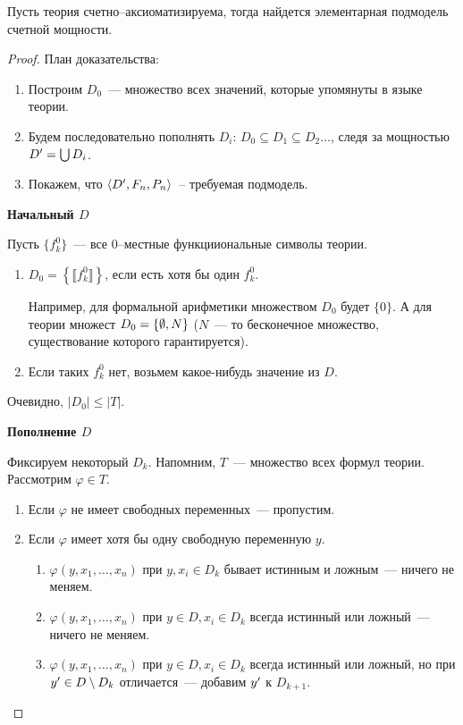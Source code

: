\begin{corollary}
    Пусть теория счетно--аксиоматизируема, тогда найдется элементарная подмодель счетной мощности.
\end{corollary}
\begin{proof}
    План доказательства:
    \begin{enumerate}
        \item Построим $D_0$~--- множество всех значений, которые упомянуты в языке теории.
        \item Будем последовательно пополнять $D_i$: $D_0 \subseteq D_1 \subseteq D_2 \dots$, следя за мощностью $D^{\prime} = \bigcup D_i$.
        \item Покажем, что $\langle D^{\prime}, F_n, P_n \rangle$~-- требуемая подмодель.
    \end{enumerate}

    \textbf{Начальный $D$}

    Пусть $\{ f_k^0 \}$~--- все 0--местные функцииональные символы теории.
    \begin{enumerate}
        \item $D_0 = \left\{ \llbracket f_k^0 \rrbracket\right\}$, если есть хотя бы один $f_k^0$.

        Например, для формальной арифметики множеством $D_0$ будет $\{0\}$. А для теории множест $D_0 = \{ \emptyset, N\}$ ($N$~--- то бесконечное множество, существование которого гарантируется).

        \item Если таких $f_k^0$ нет, возьмем какое-нибудь значение из $D$.
    \end{enumerate}
    Очевидно, $|D_0| \leqslant |T|$.

    \textbf{Пополнение $D$}

    Фиксируем некоторый $D_k$. Напомним, $T$~--- множество всех формул теории. Рассмотрим $\varphi \in T$.
    \begin{enumerate}
        \item Если $\varphi$ не имеет свободных переменных~--- пропустим.
        \item Если $\varphi$ имеет хотя бы одну свободную переменную $y$.
        \begin{enumerate}
            \item $\varphi(y, x_1, \dots, x_n)$ при $y, x_i \in D_k$ бывает истинным и ложным~--- ничего не  меняем.
            \item $\varphi(y, x_1, \dots, x_n)$ при $y \in D, x_i \in D_k$ всегда истинный или ложный~--- ничего не  меняем.
            \item $\varphi(y, x_1, \dots, x_n)$ при $y \in D, x_i \in D_k$ всегда истинный или ложный, но при $y^{\prime} \in D \setminus D_k$ отличается~--- добавим $y^{\prime}$ к $D_{k + 1}$.


\end{enumerate}
\end{enumerate}
\end{proof}
